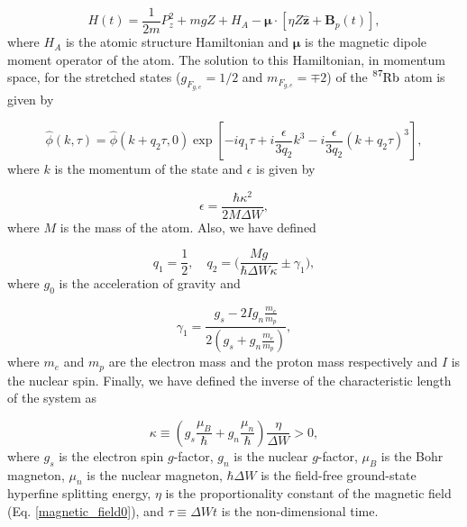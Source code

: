 \documentclass{article}
\begin{document}
\begin{equation}
\label{fullH}
H(t) = \frac{1}{2m} P_z^2 + mg Z + H_A - \boldsymbol{\mu} \cdot [\eta Z \hat{\textbf{z}} + \textbf{B}_p(t)],
\end{equation}
%
where $H_A$ is the atomic structure Hamiltonian and $\boldsymbol{\mu}$ is the magnetic dipole moment operator of the atom. The solution to this Hamiltonian, in momentum space, for the stretched states ($g_{F_{g, e}} = 1/2$ and $m_{F_{g, e}} = \mp 2$) of the $\ce{^{87}_{}Rb}$ atom is given by \cite{Castanos2014}

\begin{equation}\label{solution_momentum_space}
\widehat{\phi}(k, \tau) = \widehat{\phi}(k + q_{2}\tau, 0) \exp\left[-i q_{1} \tau + i \frac{\epsilon}{3q_{2}} k^{3} - i \frac{\epsilon}{3q_{2}} (k + q_{2} \tau)^{3} \right],
\end{equation}
%
where $k$ is the momentum of the state and $\epsilon$ is given by 

\begin{equation}\label{epsilon}
\epsilon = \frac{\hbar \kappa^{2}}{2 M \Delta W},
\end{equation}
%
where $M$ is the mass of the atom. Also, we have defined

\begin{equation}\label{q1_q2}
q_{1} = \frac{1}{2} \mathrm{,}\quad q_{2} = \bigg(\frac{M g}{\hbar \Delta W \kappa} \pm  \gamma_{1} \bigg),
\end{equation}
%
where $g_{0}$ is the acceleration of gravity and 

\begin{equation}\label{gamma_1}
\gamma_{1} = \frac{g_{s}-2 I g_{n} \frac{m_{e}}{m_{p}}}{2(g_{s}+g_{n}\frac{m_{e}}{m_{p}})},
\end{equation}
%
where $m_{e}$ and $m_{p}$ are the electron mass and the proton mass respectively and $I$ is the nuclear spin. Finally, we have defined the inverse of the characteristic length of the system as

\begin{equation}\label{kappa}
\kappa \equiv (g_{s}\frac{\mu_{B}}{\hbar} + g_{n}\frac{\mu_{n}}{\hbar}) \frac{\eta}{\Delta W} > 0,
\end{equation}
%
where $g_{s}$ is the electron spin $g$-factor, $g_{n}$ is the nuclear $g$-factor, $\mu_{B}$ is the Bohr magneton, $\mu_{n}$ is the nuclear magneton, $\hbar \Delta W$ is the field-free ground-state hyperfine splitting energy, $\eta$ is the proportionality constant of the magnetic field (Eq. \ref{magnetic_field0}), and $\tau\equiv \Delta W t$ is the non-dimensional time.
\end{document}
